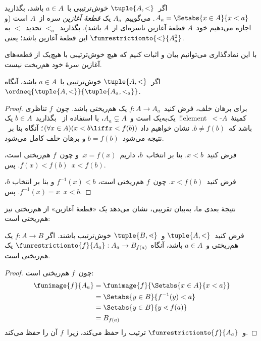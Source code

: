 \documentclass[../../../include/open-logic-section]{subfiles}
\begin{document}
\begin{defn}
اگر~$\tuple{A,<}$ خوش‌ترتیبی با~$a\in A$ باشد، بگذارید
$A_a = \Setabs{x \in A}{x<a}$. می‌گوییم~$A_a$ یک \emph{قطعهٔ آغازین}
سره از~$A$ است (و اجازه می‌دهیم خود~$A$ قطعهٔ آغازین ناسره‌ای از~$A$
باشد). بگذارید~$<_a$ تحدید~$<$ به این قطعهٔ آغازین باشد؛ یعنی
$\funrestrictionto{\mathord{<}}{A_a^2}$.
\end{defn}
\noindent
با این نمادگذاری می‌توانیم بیان و اثبات کنیم که هیچ خوش‌ترتیبی با هیچ‌یک
از قطعه‌های آغازین سرهٔ خود هم‌ریخت نیست.

\begin{lem}
اگر~$\tuple{A,<}$ خوش‌ترتیبی با~$a\in A$ باشد، آنگاه
$\ordneq{\tuple{A,<}}{\tuple{A_a,<_a}}$.
\end{lem}

\begin{proof}
برای برهان خلف، فرض کنید~$f \colon A \to A_a$ یک هم‌ریختی باشد. چون~$f$
تناظری یک‌به‌یک است و~$A_a \subsetneq A$، با استفاده
از~ بگذارید~$b\in A$ یک~!!{element}~$<$-کمینهٔ~$A$ باشد
که~$b\neq f(b)$. نشان خواهیم داد
$(\forall x \in A)(x<b \liff x<f(b))$؛ آنگاه بنا
بر~ نتیجه
می‌شود~$b=f(b)$ و برهان خلف کامل می‌شود.

فرض کنید~$x<b$. بنا بر انتخاب~$b$، داریم~$x=f(x)$. و چون~$f$ هم‌ریختی
است، $f(x)<f(b)$. پس~$x<f(b)$.

فرض کنید~$x<f(b)$. چون~$f$ هم‌ریختی است، $f^{-1}(x)<b$ و بنا بر انتخاب
$b$، $f^{-1}(x)=x$. پس~$x<b$.
\end{proof}

نتیجهٔ بعدی ما، به‌بیان تقریبی، نشان می‌دهد یک «قطعهٔ آغازین» از هم‌ریختی
نیز هم‌ریختی است:

\begin{lem}
فرض کنید~$\tuple{A,<}$ و~$\tuple{B,\lessdot}$ خوش‌ترتیب باشند. اگر
$f \colon A \to B$ یک هم‌ریختی و~$a\in A$ باشد، آنگاه
$\funrestrictionto{f}{A_a} : A_a \to B_{f(a)}$ یک هم‌ریختی است.
\end{lem}

\begin{proof}
چون~$f$ هم‌ریختی است:
\begin{align*}
	\funimage{f}{A_a} &= \funimage{f}{\Setabs{x \in A}{x<a}}\\
	&= \Setabs{y \in B}{f^{-1}(y)<a} \\
	&= \Setabs{y \in B}{y \lessdot f(a)} \\
	&=B_{f(a)}
\end{align*}
و~$\funrestrictionto{f}{A_a}$ ترتیب را حفظ می‌کند، زیرا~$f$ آن را حفظ
می‌کند.
\end{proof}
\end{document}
